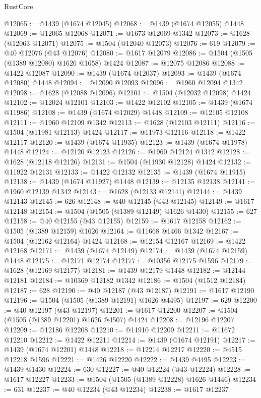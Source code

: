 \begin{lexlean}{RustCore}
\begin{coremodule}
@12065 := @1439 (@1674 @12045)
@12068 := @1439 (@1674 @12055) @1448
@12069 := @12065 @12068
@12071 := @1673 @12069 @1342
@12073 := @1628 (@12063 @12071)
@12075 := @1504 (@12040 @12073)
@12076 := 619
@12079 := @40 @12076 (@43 @12076)
@12080 := @1617 @12079
@12086 := @1504 (@1505 (@1389 @12080) @1626 @1658) @1424
@12087 := @12075 @12086
@12088 := @1422 @12087
@12090 := @1439 (@1674 @12037)
@12093 := @1439 (@1674 @12080) @1448
@12094 := @12090 @12093
@12096 := @1960 @12094 @1342
@12098 := @1628 (@12088 @12096)
@12101 := @1504 (@12032 @12098) @1424
@12102 := @12024 @12101
@12103 := @1422 @12102
@12105 := @1439 (@1674 @11986)
@12108 := @1439 (@1674 @12029) @1448
@12109 := @12105 @12108
@12111 := @1960 @12109 @1342
@12113 := @1628 (@12103 @12111)
@12116 := @1504 (@11981 @12113) @1424
@12117 := @11973 @12116
@12118 := @1422 @12117
@12120 := @1439 (@1674 @11935)
@12123 := @1439 (@1674 @11978) @1448
@12124 := @12120 @12123
@12126 := @1960 @12124 @1342
@12128 := @1628 (@12118 @12126)
@12131 := @1504 (@11930 @12128) @1424
@12132 := @11922 @12131
@12133 := @1422 @12132
@12135 := @1439 (@1674 @11915)
@12138 := @1439 (@1674 @11927) @1448
@12139 := @12135 @12138
@12141 := @1960 @12139 @1342
@12143 := @1628 (@12133 @12141)
@12144 := @1439 @12143
@12145 := 626
@12148 := @40 @12145 (@43 @12145)
@12149 := @1617 @12148
@12154 := @1504 (@1505 (@1389 @12149) @1626 @1430)
@12155 := 627
@12158 := @40 @12155 (@43 @12155)
@12159 := @1617 @12158
@12162 := @1505 (@1389 @12159) @1626
@12164 := @11668 @1466 @1342
@12167 := @1504 (@12162 @12164) @1424
@12168 := @12154 @12167
@12169 := @1422 @12168
@12171 := @1439 (@1674 @12149)
@12174 := @1439 (@1674 @12159) @1448
@12175 := @12171 @12174
@12177 := @10356 @12175 @1596
@12179 := @1628 (@12169 @12177)
@12181 := @1439 @12179 @1448
@12182 := @12144 @12181
@12184 := @10369 @12182 @1342
@12186 := @1504 (@1512 @12184)
@12187 := 628
@12190 := @40 @12187 (@43 @12187)
@12191 := @1617 @12190
@12196 := @1504 (@1505 (@1389 @12191) @1626 @4495)
@12197 := 629
@12200 := @40 @12197 (@43 @12197)
@12201 := @1617 @12200
@12207 := @1504 (@1505 (@1389 @12201) @1626 @4507) @1424
@12208 := @12196 @12207
@12209 := @12186 @12208
@12210 := @11910 @12209
@12211 := @11672 @12210
@12212 := @1422 @12211
@12214 := @1439 (@1674 @12191)
@12217 := @1439 (@1674 @12201) @1448
@12218 := @12214 @12217
@12220 := @4515 @12218 @1596
@12221 := @1426 @12220
@12222 := @1439 @4495
@12223 := @1439 @1430
@12224 := 630
@12227 := @40 @12224 (@43 @12224)
@12228 := @1617 @12227
@12233 := @1504 (@1505 (@1389 @12228) @1626 @1446)
@12234 := 631
@12237 := @40 @12234 (@43 @12234)
@12238 := @1617 @12237

\end{coremodule}
\end{lexlean}

